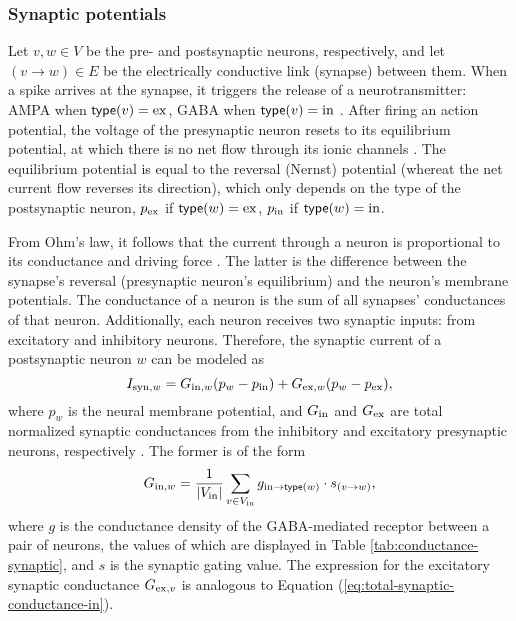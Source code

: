 \subsubsection{Synaptic potentials}
\label{sec:synaptic-potentials}

Let $v, w \in V$ be the pre- and postsynaptic neurons, respectively, and let $(v \to w) \in E$ be the electrically conductive link (synapse) between them. When a spike arrives at the synapse, it triggers the release of a neurotransmitter: AMPA when $\mathsf{type}(v) = \mathrm{ex}$, GABA when $\mathsf{type}(v) = \mathrm{in}$ \cite{Lowet2015}. After firing an action potential, the voltage of the presynaptic neuron resets to its equilibrium potential, at which there is no net flow through its ionic channels \cite{JohnsBook2014:6}. The equilibrium potential is equal to the reversal (Nernst) potential (whereat the net current flow reverses its direction), which only depends on the type of the postsynaptic neuron, $p_{\mathrm{ex}}$ if $\mathsf{type}(w) = \mathrm{ex}$, $p_{\mathrm{in}}$ if $\mathsf{type}(w) = \mathrm{in}$. 

From Ohm's law, it follows that the current through a neuron is proportional to its conductance and driving force \cite{KandelBook2003:6}. The latter is the difference between the synapse's reversal (presynaptic neuron's equilibrium) and the neuron's membrane potentials. The conductance of a neuron is the sum of all synapses' conductances of that neuron. Additionally, each neuron receives two synaptic inputs: from excitatory and inhibitory neurons. Therefore, the synaptic current of a postsynaptic neuron $w$ can be modeled as
\begin{equation}
    I_{\mathrm{syn}, w} = G_{\mathrm{in}, w} (p_{w} - p_{\mathrm{in}}) + G_{\mathrm{ex}, w} (p_{w} - p_{\mathrm{ex}}),
    \label{eq:synaptic-current}
\end{equation}
where $p_w$ is the neural membrane potential, and $G_{\mathrm{in}}$ and $G_{\mathrm{ex}}$ are total normalized synaptic conductances from the inhibitory and excitatory presynaptic neurons, respectively \cite{Jensen2005}. The former is of the form 
\begin{equation}
    G_{\mathrm{in}, w} = \frac{1}{|V_{\mathrm{in}}|} \sum_{v \in V_{\mathrm{in}}} g_{\mathrm{in} \to \mathsf{type}(w)} \cdot s_{(v \to w)},
    \label{eq:total-synaptic-conductance-in}
\end{equation}
where $g$ is the conductance density of the GABA-mediated receptor between a pair of neurons, the values of which are displayed in Table \ref{tab:conductance-synaptic}, and $s$ is the synaptic gating value. The expression for the excitatory synaptic conductance $G_{\mathrm{ex}, v}$ is analogous to Equation (\ref{eq:total-synaptic-conductance-in}).

